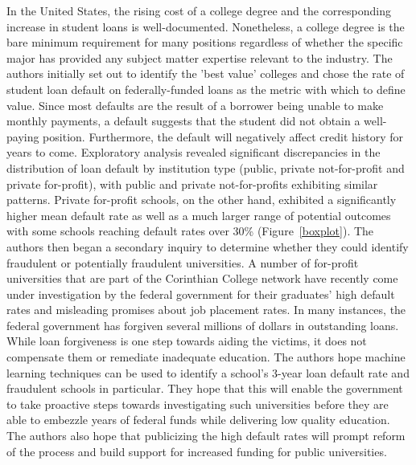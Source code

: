 \documentclass[10pt,twocolumn]{article}
\begin{document}
In the United States, the rising cost of a college degree and the corresponding
increase in student loans is well-documented. Nonetheless, a college degree is the bare
minimum requirement for many positions regardless of whether the specific major
has provided any subject matter expertise relevant to the industry. The authors
initially set out to identify the 'best value' colleges and chose the rate of
student loan default on federally-funded loans as the metric with which to define
value. Since most defaults are the result of a borrower being unable to make monthly
payments, a default suggests that the student did not obtain a well-paying position.
Furthermore, the default will negatively affect credit history for years to come. Exploratory analysis
revealed significant discrepancies in the distribution of loan default by
institution type (public, private not-for-profit and private for-profit), with public and
private not-for-profits exhibiting similar patterns. Private for-profit schools, on the other hand,
exhibited a significantly
higher mean default rate as well as a much larger range of potential outcomes with
some schools reaching default rates over 30\% (Figure~\ref{boxplot}).
The authors then
began a secondary inquiry to determine whether they could identify fraudulent or
potentially fraudulent universities. A number of for-profit universities that are part of
the Corinthian College network have recently come under investigation by the federal government
for their graduates' high default rates and misleading promises about job placement rates. In many instances,
the federal government has forgiven several millions of dollars in outstanding loans.
While loan forgiveness is one step towards aiding the victims, it does not
compensate them or remediate inadequate education.
The authors hope machine learning techniques can be used to identify a school's
3-year loan default rate and fraudulent schools in particular. They hope that this
will enable the government to take proactive steps towards investigating such universities
before they are able to embezzle years of federal funds while delivering low quality
education. The authors also hope that publicizing the high default rates will prompt
reform of the process and build support for increased funding for public universities.
\end{document}
